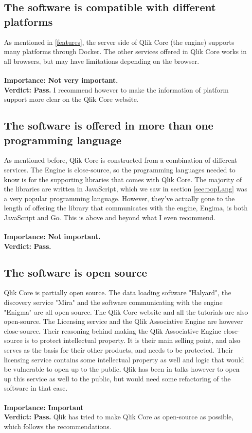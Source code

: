 \documentclass{cslthse-msc}
\begin{document}
    \subsection{The software is compatible with different platforms}
    As mentioned in \ref{features}, the server side of Qlik Core (the engine) supports many platforms through Docker. The other services offered in Qlik Core works in all browsers, but may have limitations depending on the browser. \\\\
    \textbf{Importance: Not very important.}\\
    \textbf{Verdict: Pass.} I recommend however to make the information of platform support more clear on the Qlik Core website.
    \subsection{The software is offered in more than one programming language}
    As mentioned before, Qlik Core is constructed from a combination of different services. The Engine is close-source, so the programming languages needed to know is for the supporting libraries that comes with Qlik Core. The majority of the libraries are written in JavaScript, which we saw in section \ref{sec:popLang} was a very popular programming language. However, they've actually gone to the length of offering the library that communicates with the engine, Engima, is both JavaScript and Go. This is above and beyond what I even recommend.\\\\
    \textbf{Importance: Not important.}\\
    \textbf{Verdict: Pass.}
    \subsection{The software is open source}
    Qlik Core is partially open source. The data loading software "Halyard", the discovery service "Mira" and the software communicating with the engine "Enigma" are all open source. The Qlik Core website and all the tutorials are also open-source. The Licensing service and the Qlik Associative Engine are however close-source. Their reasoning behind making the Qlik Associative Engine close-source is to protect intellectual property. It is their main selling point, and also serves as the basis for their other products, and needs to be protected. Their licensing service contains some intellectual property as well and logic that would be vulnerable to open up to the public. Qlik has been in talks however to open up this service as well to the public, but would need some refactoring of the software in that case.\\\\
    \textbf{Importance: Important}\\
    \textbf{Verdict: Pass.} Qlik has tried to make Qlik Core as open-source as possible, which follows the recommendations.
\end{document}
